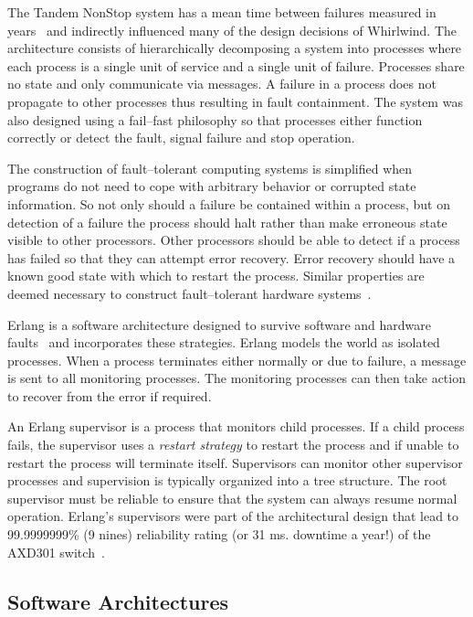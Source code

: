 \documentclass[conference]{IEEEtran}
\begin{document}
The Tandem NonStop system has a mean time between failures measured in years~\cite{Grey85Fail} and indirectly influenced many of the design decisions of Whirlwind. The architecture consists of hierarchically decomposing a system into processes where each process is a single unit of service and a single unit of failure. Processes share no state and only communicate via messages. A failure in a process does not propagate to other processes thus resulting in fault containment. The system was also designed using a fail--fast philosophy so that processes either function correctly or detect the fault, signal failure and stop operation.

The construction of fault--tolerant computing systems is simplified when programs do not need to cope with arbitrary behavior or corrupted state information. So not only should a failure be contained within a process, but on detection of a failure the process should halt rather than make erroneous state visible to other processors. Other processors should be able to detect if a process has failed so that they can attempt error recovery. Error recovery should have a known good state with which to restart the process. Similar properties are deemed necessary to construct fault--tolerant hardware systems~\cite{Schneider:FailStopProcessors}.  

Erlang is a software architecture designed to survive software and hardware faults~\cite{Armstrong03Thesis} and incorporates these strategies. Erlang models the world as isolated processes. When a process terminates either normally or due to failure, a message is sent to all monitoring processes. The monitoring processes can then take action to recover from the error if required.

An Erlang supervisor is a process that monitors child processes. If a child process fails, the supervisor uses a \emph{restart strategy} to restart the process and if unable to restart the process will terminate itself. Supervisors can monitor other supervisor processes and supervision is typically organized into a tree structure. The root supervisor must be reliable to ensure that the system can always resume normal operation. Erlang's supervisors were part of the architectural design that lead to 99.9999999\% (9 nines) reliability rating (or 31 ms. downtime a year!) of the AXD301 switch~\cite{armstrong:02:COP}.

\subsection{Software Architectures}
\end{document}
